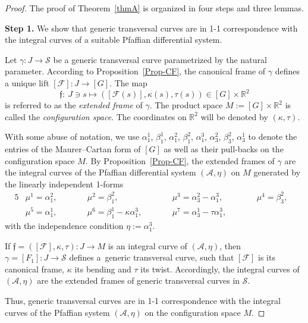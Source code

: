 \documentclass[10pt,a4paper]{amsart}
\numberwithin{equation}{section}
\def\R{\mathbb{R}}
\def\S{\mathcal{S}}
\def\F{\mathcal{F}}
\def\S{\mathcal{S}}
\begin{document}
\begin{proof}
The proof of Theorem~\ref{thmA} is organized in four steps and three lemmas.

\textbf{Step 1.} We show that generic transversal curves are in 1-1 correspondence
with the integral curves of a suitable Pfaffian differential system.

Let $\gamma \colon J \to \S$ be a generic transversal curve parametrized by the natural parameter.
According to Proposition~\ref{Prop-CF}, the canonical frame of $\gamma$ defines a unique lift
$[\mathcal{F}] \colon J \to [G]$.
%
The map
\[
 \mathfrak{f} \colon \ J\ni s\longmapsto ( [\F(s)], \kappa(s), \tau(s))\in [G]\times\R^2
 \]
is referred to as the \textit{extended frame} of $\gamma$.
%
The product space $M := [G]\times\R^2$ is called the \emph{configuration space}. The coordinates
on $\R^2$ will be denoted by $(\kappa, \tau)$.
%

With some abuse of notation,
we use $\alpha_1^1$, $\beta_1^1$, $\alpha_1^2$, $\beta_1^2$, $\alpha_1^3$,
$\alpha_3^2$, $\beta_3^2$, $\alpha_3^1$ to denote the entries of the Maurer--Cartan form of $[{G}]$
as well as their pull-backs on the configuration space $M$.
%
By Proposition~\ref{Prop-CF}, the extended frames of $\gamma$ are the integral curves of the Pfaffian
differential system $(\mathcal A, \eta)$ on $M$ generated by the
linearly independent 1-forms
\begin{alignat*}{5}
 & \mu^1=\alpha_1^2,\qquad && \mu^2=\beta_1^2 ,\qquad && \mu^3= \alpha_3^2- {\alpha^3_1},\qquad && \mu^4=\beta_3^2 , & \\
 & \mu^5=\alpha_1^1 ,\qquad && \mu^6=\beta_1^1-\kappa \alpha_1^3,\qquad && \mu^7 =\alpha_3^1-\tau\alpha_1^3,\qquad  &
\end{alignat*}
with the independence condition $\eta :=\alpha_1^3$.

If $\mathfrak{f} = ( [\F], \kappa, \tau) \colon J \to M$ is an integral curve of $(\mathcal{A}, \eta)$, then
$\gamma = [F_1] \colon J \to \mathcal S$ defines a~generic transversal curve, such that $[\F]$ is its canonical frame,
$\kappa$ its bending and $\tau$ its twist.
Accordingly, the integral curves of $(\mathcal{A},\eta)$ are the extended frames of generic transversal curves
in $\mathcal S$.

Thus, generic transversal curves are in 1-1 correspondence with the integral curves of the Pfaffian system
$(\mathcal{A},\eta)$ on the configuration space $M$.


\end{proof}
\end{document}
